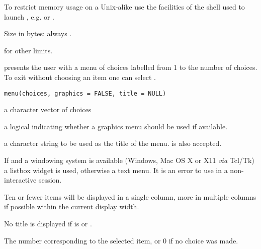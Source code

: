 %
\begin{Details}\relax
To restrict memory usage on a Unix-alike use the facilities of the
shell used to launch \R{}, e.g.  or .
\end{Details}
%
\begin{Value}
Size in bytes: always .
\end{Value}
%
\begin{SeeAlso}\relax
{} for other limits.
\end{SeeAlso}
%
\begin{Description}\relax
{} presents the user with a menu of choices labelled from 1
to the number of choices.  To exit without choosing an item one can
select .
\end{Description}
%
\begin{Usage}
\begin{verbatim}
menu(choices, graphics = FALSE, title = NULL)
\end{verbatim}
\end{Usage}
%
\begin{Arguments}
\begin{ldescription}
\item[\code{choices}] a character vector of choices
\item[\code{graphics}] a logical indicating whether a graphics menu should be
used if available.
\item[\code{title}] a character string to be used as the title of the menu.
 is also accepted.
\end{ldescription}
\end{Arguments}
%
\begin{Details}\relax
If  and a windowing system is available
(Windows, Mac OS X or X11 \emph{via} Tcl/Tk) a listbox widget is
used, otherwise a text menu.  It is an error to use  in a
non-interactive session.

Ten or fewer items will be displayed in a single column, more in
multiple columns if possible within the current display width.

No title is displayed if  is  or .
\end{Details}
%
\begin{Value}
The number corresponding to the selected item, or 0 if no choice was
made.
\end{Value}
